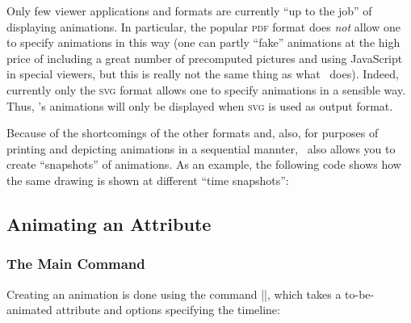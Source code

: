 Only few viewer applications and formats are currently ``up to the
job'' of displaying animations.  In particular, 
the popular \textsc{pdf} format does \emph{not} allow one to specify
animations in this way (one can partly ``fake'' animations at the
high price of including a great number of precomputed pictures and
using JavaScript in special viewers, but this is really not the same
thing as what \pgfname\ does). Indeed, currently only the  \textsc{svg}
format allows one to specify animations in a sensible way. Thus,
\pgfname's animations will only be displayed when \textsc{svg} is used
as output format.

Because of the shortcomings of the other formats and, also, for
purposes of printing and depicting animations in a sequential mannter,
\pgfname\ also allows you to create ``snapshots'' of animations. As an
example, the following code shows how the same drawing is shown at
different ``time snapshots'':

\begin{codeexample}[width=3.9cm]
\tikz [make snapshot of=0.5s, animate me = { :rotate = { 0s = "0", 2s = "90" } }]
  { \node [draw=blue, very thick] {\pgfname}; }
\tikz [make snapshot of=1s, animate me = { :rotate = { 0s = "0", 2s = "90" } }]
  { \node [draw=blue, very thick] {\pgfname}; }
\tikz [make snapshot of=1.5s, animate me = { :rotate = { 0s = "0", 2s = "90" } }]
  { \node [draw=blue, very thick] {\pgfname}; }
\tikz [make snapshot of=2s, animate me = { :rotate = { 0s = "0", 2s = "90" } }]
  { \node [draw=blue, very thick] {\pgfname}; }
\end{codeexample}


\subsection{Animating an Attribute}

\subsubsection{The Main Command}

Creating an animation is done using the command
|\pgfanimateattribute|, which takes a to-be-animated attribute and
options specifying the timeline:

